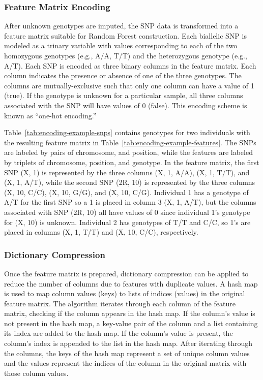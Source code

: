 \subsubsection{Feature Matrix Encoding}
After unknown genotypes are imputed, the SNP data is transformed into a feature matrix suitable for Random Forest construction.  Each biallelic SNP is modeled as a trinary variable with values corresponding to each of the two homozygous genotypes (e.g., A/A, T/T) and the heterozygous genotype (e.g., A/T). Each SNP is encoded as three binary columns in the feature matrix.  Each column indicates the presence or absence of one of the three genotypes.  The columns are mutually-exclusive such that only one column can have a value of 1 (true).  If the genotype is unknown for a particular sample, all three columns associated with the SNP will have values of 0 (false).  This encoding scheme is known as ``one-hot encoding.''

Table~\ref{tab:encoding-example-snps} contains genotypes for two individuals with the resulting feature matrix in Table~\ref{tab:encoding-example-features}.  The SNPs are labeled by pairs of chromosome, and position, while the features are labeled by triplets of chromosome, position, and genotype.  In the feature matrix, the first SNP (X, 1) is represented by the three columns (X, 1, A/A), (X, 1, T/T), and (X, 1, A/T), while the second SNP (2R, 10) is represented by the three columns (X, 10, C/C), (X, 10, G/G), and (X, 10, C/G). Individual 1 has a genotype of A/T for the first SNP so a 1 is placed in column 3 (X, 1, A/T), but the columns associated with SNP (2R, 10) all have values of 0 since individual 1's genotype for (X, 10) is unknown.  Individual 2 has genotypes of T/T and C/C, so 1's are placed in columns (X, 1, T/T) and (X, 10, C/C), respectively.

\subsubsection{Dictionary Compression}
Once the feature matrix is prepared, dictionary compression can be applied to reduce the number of columns due to features with duplicate values.  A hash map is used to map column values (keys) to lists of indices (values) in the original feature matrix.   The algorithm iterates through each column of the feature matrix, checking if the column appears in the hash map.  If the column's value is not present in the hash map, a key-value pair of the column and a list containing its index are added to the hash map.  If the column's value is present, the column's index is appended to the list in the hash map.  After iterating through the columns, the keys of the hash map represent a set of unique column values and the values represent the indices of the column in the original matrix with those column values.

